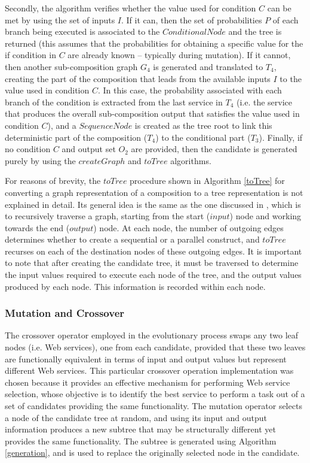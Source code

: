 Secondly, the algorithm verifies whether the value used for condition $C$ can be met by using the set of inputs $I$. If it can, then the set of probabilities $P$ of each branch being executed is associated to the $ConditionalNode$ and the tree is returned (this assumes that the probabilities for obtaining a specific value for the if condition in $C$ are already known -- typically during mutation). If it cannot, then another sub-composition graph $G_4$ is generated and translated to $T_4$, creating the part of the composition that leads from the available inputs $I$ to the value used in condition $C$. In this case, the probability associated with each branch of the condition is extracted from the last service in $T_4$ (i.e. the service that produces the overall sub-composition output that satisfies the value used in condition $C$), and a $SequenceNode$ is created as the tree root to link this deterministic part of the composition ($T_4$) to the conditional part ($T_3$). Finally, if no condition $C$ and output set $O_2$ are provided, then the candidate is generated purely by using the $createGraph$ and $toTree$ algorithms. 

For reasons of brevity, the $toTree$ procedure shown in Algorithm \ref{toTree} for converting a graph representation of a composition to a tree representation is not explained in detail. Its general idea is the same as the one discussed in \cite{nguyen2005text}, which is to recursively traverse a graph, starting from the start ($input$) node and working towards the end ($output$) node. At each node, the number of outgoing edges determines whether to create a sequential or a parallel construct, and $toTree$ recurses on each of the destination nodes of these outgoing edges. It is important to note that after creating the candidate tree, it must be traversed to determine the input values required to execute each node of the tree, and the output values produced by each node. This information is recorded within each node.

\subsubsection{Mutation and Crossover}\label{mutation}

The crossover operator employed in the evolutionary process swaps any two leaf nodes (i.e. Web services), one from each candidate, provided that these two leaves are functionally equivalent in terms of input and output values but represent different Web services. This particular crossover operation implementation was chosen because it provides an effective mechanism for performing Web service selection, whose objective is to identify the best service to perform a task out of a set of candidates providing the same functionality.
The mutation operator selects a node of the candidate tree at random, and using its input and output information produces a new subtree that may be structurally different yet provides the same functionality. The subtree is generated using Algorithm \ref{generation}, and is used to  replace the originally selected node in the candidate.

